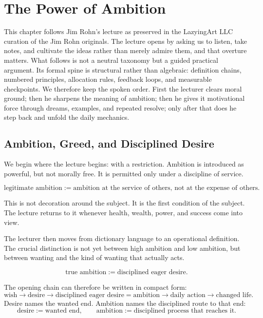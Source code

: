 \chapter{The Power of Ambition}

This chapter follows Jim Rohn's lecture as preserved in the LazyingArt LLC curation of the Jim Rohn originals. The lecture opens by asking us to listen, take notes, and cultivate the ideas rather than merely admire them, and that overture matters. What follows is not a neutral taxonomy but a guided practical argument. Its formal spine is structural rather than algebraic: definition chains, numbered principles, allocation rules, feedback loops, and measurable checkpoints. We therefore keep the spoken order. First the lecturer clears moral ground; then he sharpens the meaning of ambition; then he gives it motivational force through dreams, examples, and repeated resolve; only after that does he step back and unfold the daily mechanics.

\section{Ambition, Greed, and Disciplined Desire}

We begin where the lecture begins: with a restriction. Ambition is introduced as powerful, but not morally free. It is permitted only under a discipline of service.

\begin{definition}
\[
\text{legitimate ambition} := \text{ambition at the service of others, not at the expense of others}.
\]
\end{definition}

This is not decoration around the subject. It is the first condition of the subject. The lecture returns to it whenever health, wealth, power, and success come into view.

The lecturer then moves from dictionary language to an operational definition. The crucial distinction is not yet between high ambition and low ambition, but between wanting and the kind of wanting that actually acts.

\begin{definition}
\[
\text{true ambition} := \text{disciplined eager desire}.
\]
\end{definition}

The opening chain can therefore be written in compact form:
\begin{equation}
\text{wish} \to \text{desire} \to \text{disciplined eager desire} = \text{ambition} \to \text{daily action} \to \text{changed life}.
\end{equation}
Desire names the wanted end. Ambition names the disciplined route to that end:
\begin{equation}
\text{desire} := \text{wanted end}, \qquad
\text{ambition} := \text{disciplined process that reaches it}.
\end{equation}

